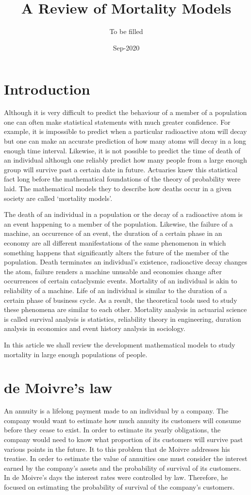 \documentclass{article}
\title{A Review of Mortality Models}
\author{To be filled}
\date{Sep-2020}
\numberwithin{equation}{section}
\begin{document}
\maketitle
\section{Introduction}\label{s0}
Although it is very difficult to predict the behaviour of a member of a 
population one can often make statistical statements with much greater 
confidence. For example, it is impossible to predict when a particular 
radioactive atom will decay but one can make an accurate prediction of how 
many atoms will decay in a long enough time interval. Likewise, it is not
possible to predict the time of death of an individual although one reliably
predict how many people from a large enough group will survive past a certain
date in future. Actuaries knew this statistical fact long before the 
mathematical foundations of the theory of probability were laid. The 
mathematical models they to describe how deaths occur in a given society are
called `mortality models'.

The death of an individual in a population or the decay of a radioactive atom
is an event happening to a member of the population. Likewise, the failure of
a machine, an occurrence of an event, the duration of a certain phase in an
economy are all different manifestations of the same phenomenon in which 
something happens that significantly alters the future of the member of the
population. Death terminates an individual's existence, radioactive decay
changes the atom, failure renders a machine unusable and economies change 
after occurrences of certain cataclysmic events. Mortality of an individual
is akin to reliability of a machine. Life of an individual is similar to
the duration of a certain phase of business cycle. As a result, the 
theoretical tools used to study these phenomena are similar to each other. 
Mortality analysis in actuarial science is called survival analysis is 
statistics, reliability theory in engineering, duration analysis in economics 
and event history analysis in sociology.

In this article we shall review the development mathematical models to study
mortality in large enough populations of people.

\section{de Moivre's law}\label{s1}
An annuity is a lifelong payment made to an individual by a company. The 
company would want to estimate how much annuity its customers will consume
before they cease to exist. In order to estimate its yearly obligations, the
company would need to know what proportion of its customers will survive
past various points in the future. It to this problem that de Moivre 
\cite{de1731annuities} addresses his treatise. In order to estimate the value
of annuities one must consider the interest earned by the company's assets and
the probability of survival of its customers. In de Moivre's days the interest
rates were controlled by law. Therefore, he focused on estimating the 
probability of survival of the company's customers.
\end{document}
